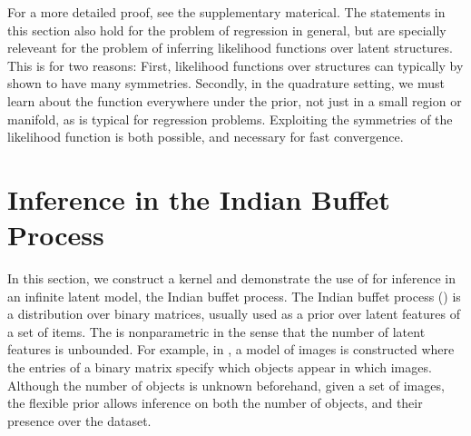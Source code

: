 
For a more detailed proof, see the supplementary materical.  The statements in this section also hold for the problem of \gp{} regression in general, but are specially releveant for the problem of inferring likelihood functions over latent structures.  This is for two reasons:  First, likelihood functions over structures can typically by shown to have many symmetries.  Secondly, in the quadrature setting, we must learn about the function everywhere under the prior, not just in a small region or manifold, as is typical for regression problems.  Exploiting the symmetries of the likelihood function is both possible, and necessary for fast convergence.






\section{Inference in the Indian Buffet Process}

In this section, we construct a kernel and demonstrate the use of \bq{} for inference in an infinite latent model, the Indian buffet process.  The Indian buffet process (\ibp{}) \cite{griffiths2005infinite} is a distribution over binary matrices, usually used as a prior over latent features of a set of items.  The \ibp{} is nonparametric in the sense that the number of latent features is unbounded.
%
For example, in \cite{griffiths2005infinite}, a model of images is constructed where the entries of a binary matrix specify which objects appear in which images.  Although the number of objects is unknown beforehand, given a set of images, the flexible \ibp{} prior allows inference on both the number of objects, and their presence over the dataset.


